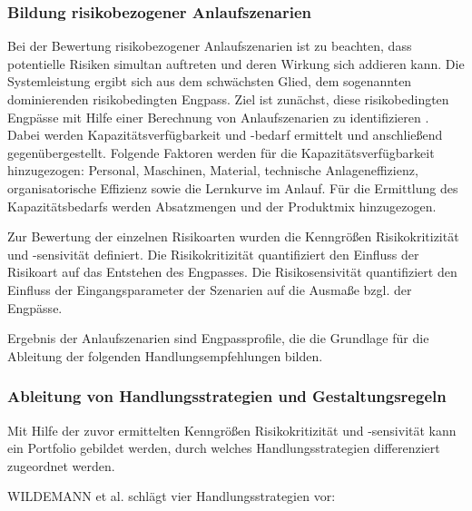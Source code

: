 \subsubsection*{Bildung risikobezogener Anlaufszenarien}\label{sec:wildemannszenarien}
Bei der Bewertung risikobezogener Anlaufszenarien ist zu beachten, dass potentielle Risiken simultan auftreten und deren Wirkung sich addieren kann. Die Systemleistung ergibt sich aus dem schwächsten Glied, dem sogenannten dominierenden risikobedingten Engpass. Ziel ist zunächst, diese risikobedingten Engpässe mit Hilfe einer Berechnung von Anlaufszenarien zu identifizieren \autocite{Fleischer2003}. 
Dabei werden Kapazitätsverfügbarkeit und -bedarf ermittelt und anschließend gegenübergestellt. Folgende Faktoren werden für die Kapazitätsverfügbarkeit hinzugezogen: Personal, Maschinen, Material, technische Anlageneffizienz, organisatorische Effizienz sowie die Lernkurve im Anlauf.
Für die Ermittlung des Kapazitätsbedarfs werden Absatzmengen und der Produktmix hinzugezogen. 

Zur Bewertung der einzelnen Risikoarten wurden die Kenngrößen Risikokritizität und -sensivität definiert. 
Die Risikokritizität quantifiziert den Einfluss der Risikoart auf das Entstehen des Engpasses. Die Risikosensivität quantifiziert den Einfluss der Eingangsparameter der Szenarien auf die Ausmaße bzgl. der Engpässe. 

Ergebnis der Anlaufszenarien sind Engpassprofile, die die Grundlage für die Ableitung der folgenden Handlungsempfehlungen bilden. 

\subsubsection*{Ableitung von Handlungsstrategien und Gestaltungsregeln}

Mit Hilfe der zuvor ermittelten Kenngrößen Risikokritizität und -sensivität kann ein Portfolio gebildet werden, durch welches Handlungsstrategien differenziert zugeordnet werden. 

WILDEMANN et al. schlägt vier Handlungsstrategien vor: 

